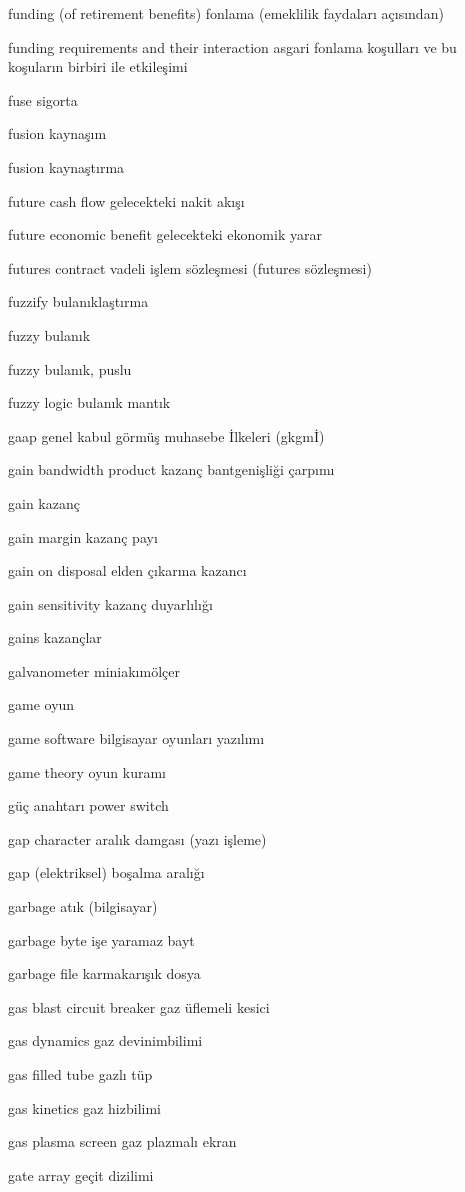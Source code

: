 \documentclass[12pt,fleqn]{article}\usepackage{../../common}
\begin{document}
funding (of retirement benefits) fonlama (emeklilik faydaları açısından)

funding requirements and their interaction asgari fonlama koşulları ve bu koşuların birbiri ile etkileşimi

fuse sigorta

fusion kaynaşım

fusion kaynaştırma

future cash flow gelecekteki nakit akışı

future economic benefit gelecekteki ekonomik yarar

futures contract vadeli işlem sözleşmesi (futures sözleşmesi)

fuzzify bulanıklaştırma

fuzzy bulanık

fuzzy bulanık, puslu

fuzzy logic bulanık mantık

gaap genel kabul görmüş muhasebe İlkeleri (gkgmİ)

gain bandwidth product kazanç bantgenişliği çarpımı

gain kazanç

gain margin kazanç payı

gain on disposal elden çıkarma kazancı

gain sensitivity kazanç duyarlılığı

gains kazançlar

galvanometer miniakımölçer

game oyun

game software bilgisayar oyunları yazılımı

game theory oyun kuramı

güç anahtarı power switch

gap character aralık damgası (yazı işleme)

gap (elektriksel) boşalma aralığı

garbage atık (bilgisayar)

garbage byte işe yaramaz bayt

garbage file karmakarışık dosya

gas blast circuit breaker gaz üflemeli kesici

gas dynamics gaz devinimbilimi

gas filled tube gazlı tüp

gas kinetics gaz hizbilimi

gas plasma screen gaz plazmalı ekran

gate array geçit dizilimi
\end{document}
